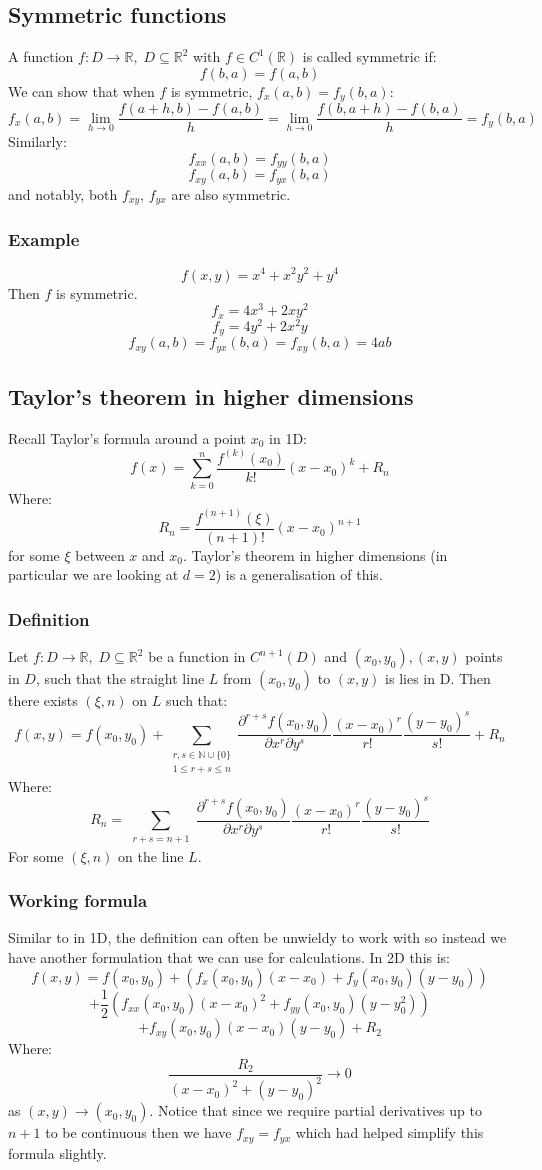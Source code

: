 \documentclass[12pt]{article}
\newcommand{\pf}[2]{\frac{\partial #1}{\partial #2}}
\begin{document}
\subsection*{Symmetric functions}
A function \(f:D\to\mathbb{R},\;D\subseteq\mathbb{R}^2\) with \(f\in C^1(\mathbb{R})\) is called symmetric if:
\[f(b,a)=f(a,b)\]
We can show that when \(f\) is symmetric, \(f_x(a,b)=f_y(b,a)\):
\[f_x(a,b)=\lim_{h\to 0}\frac{f(a+h,b)-f(a,b)}{h}=\lim_{h\to 0}\frac{f(b,a+h)-f(b,a)}{h}=f_y(b,a)\]
Similarly:
\[f_{xx}(a,b)=f_{yy}(b,a)\]
\[f_{xy}(a,b)=f_{yx}(b,a)\]
and notably, both \(f_{xy},\,f_{yx}\) are also symmetric.
\subsubsection*{Example}
\[f(x,y)=x^4+x^2y^2+y^4\]
Then \(f\) is symmetric.
\[f_x=4x^3+2xy^2\]
\[f_y=4y^2+2x^2y\]
\[f_{xy}(a,b)=f_{yx}(b,a)=f_{xy}(b,a)=4ab\]
\subsection*{Taylor's theorem in higher dimensions}
Recall Taylor's formula around a point \(x_0\) in 1D:
\[f(x)=\sum^n_{k=0}\frac{f^{(k)}(x_0)}{k!}(x-x_0)^k+R_n\]
Where:
\[R_n=\frac{f^{(n+1)}(\xi)}{(n+1)!}(x-x_0)^{n+1}\]
for some \(\xi\) between \(x\) and \(x_0\). Taylor's theorem in higher dimensions (in particular we are looking at \(d=2\)) is a generalisation of this.
\subsubsection*{Definition}
Let \(f:D\to\mathbb{R},\;D\subseteq \mathbb{R}^2\) be a function in \(C^{n+1}(D)\) and \((x_0,y_0),(x,y)\) points in \(D\), such that the straight line \(L\) from \((x_0,y_0)\) to \((x,y)\) is lies in D. Then there exists \((\xi,n)\) on \(L\) such that:
\[f(x,y)=f(x_0,y_0)+\sum_{\substack{r,s\in \mathbb{N}\cup \{0\}\\ 1\leq r+s\leq n}}\pf{^{r+s}f(x_0,y_0)}{x^r\partial y^s}\frac{(x-x_0)^r}{r!}\frac{(y-y_0)^s}{s!}+R_n\]
Where:
\[R_n=\sum_{\substack{r+s=n+1}}\pf{^{r+s}f(x_0,y_0)}{x^r\partial y^s}\frac{(x-x_0)^r}{r!}\frac{(y-y_0)^s}{s!}\]
For some \((\xi,n)\) on the line \(L\).
\subsubsection*{Working formula}
Similar to in 1D, the definition can often be unwieldy to work with so instead we have another formulation that we can use for calculations. In 2D this is:
\[f(x,y)=f(x_0,y_0)+\left(f_x(x_0,y_0)(x-x_0)+f_y(x_0,y_0)(y-y_0)\right)\]
\[+\frac{1}{2}(f_{xx}(x_0,y_0)(x-x_0)^2+f_{yy}(x_0,y_0)(y-y_0^2))\]
\[+f_{xy}(x_0,y_0)(x-x_0)(y-y_0)+R_2\]
Where:
\[\frac{R_2}{(x-x_0)^2+(y-y_0)^2}\to 0\]
as \((x,y)\to(x_0,y_0)\). Notice that since we require partial derivatives up to \(n+1\) to be continuous then we have \(f_{xy}=f_{yx}\) which had helped simplify this formula slightly.
\end{document}
